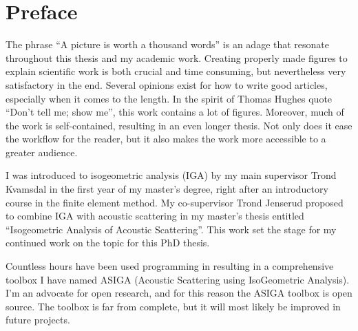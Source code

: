 \chapter*{Preface}
%
The phrase ``A picture is worth a thousand words'' is an adage that resonate throughout this thesis and my academic work. Creating properly made figures to explain scientific work is both crucial and time consuming, but nevertheless very satisfactory in the end. Several opinions exist for how to write good articles, especially when it comes to the length. In the spirit of Thomas Hughes quote ``Don't tell me; show me'', this work contains a lot of figures. Moreover, much of the work is self-contained, resulting in an even longer thesis. Not only does it ease the workflow for the reader, but it also makes the work more accessible to a greater audience.

I was introduced to isogeometric analysis (IGA) by my main supervisor Trond Kvamsdal in the first year of my master's degree, right after an introductory course in the finite element method. My co-supervisor Trond Jenserud proposed to combine IGA with acoustic scattering in my master's thesis entitled ``Isogeometric Analysis of Acoustic Scattering''. This work set the stage for my continued work on the topic for this PhD thesis.

Countless hours have been used programming in \MATLAB resulting in a comprehensive toolbox I have named ASIGA (Acoustic Scattering using IsoGeometric Analysis). I'm an advocate for open research, and for this reason the ASIGA toolbox is open source. The toolbox is far from complete, but it will most likely be improved in future projects.

